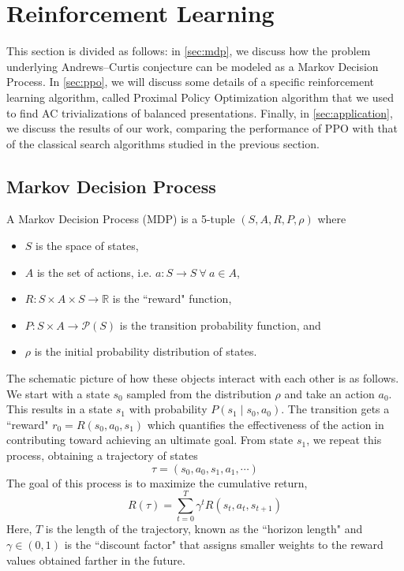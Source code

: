 
\section{Reinforcement Learning}\label{sec:rl}


This section is divided as follows: in \autoref{sec:mdp}, we discuss how the problem underlying Andrews--Curtis conjecture can be modeled as a Markov Decision Process. In \autoref{sec:ppo}, we will discuss some details of a specific reinforcement learning algorithm, called Proximal Policy Optimization algorithm that we used to find AC trivializations of balanced presentations. Finally, in \autoref{sec:application}, we discuss the results of our work, comparing the performance of PPO with that of the classical search algorithms studied in the previous section.

\subsection{Markov Decision Process} \label{sec:mdp}

A Markov Decision Process (MDP) is a 5-tuple $(S, A, R, P, \rho)$ where
\begin{itemize}
	\item $S$ is the space of states,
	\item $A$ is the set of actions, i.e. $a \colon S \to S \ \forall \ a \in A$,
	\item $R \colon S \times A \times S \to \mathbb{R}$ is the ``reward" function,
	\item $P \colon S \times A \to \mathcal{P}(S)$ is the transition probability function, and
	\item $\rho$ is the initial probability distribution of states.
\end{itemize}

The schematic picture of how these objects interact with each other is as follows. We start with a state $s_0$ sampled from the distribution $\rho$ and take an action $a_0$. This results in a state $s_1$ with probability $P(s_1 \mid s_0, a_0) $. The transition gets a ``reward" $r_0 = R(s_0, a_0, s_1)$ which quantifies the effectiveness of the action in contributing toward achieving an ultimate goal. From state $s_1$, we repeat this process, obtaining a trajectory of states
\[
\tau = \left( s_0, a_0, s_1, a_1, \cdots \right)
\]
The goal of this process is to maximize the cumulative return,
\[
R(\tau) = \sum\limits_{t=0}^{T} \gamma^t R(s_t, a_t, s_{t+1})
\]
Here, $T$ is the length of the trajectory, known as the ``horizon length" and $\gamma \in \left(0, 1 \right)$ is the ``discount factor" that assigns smaller weights to the reward values obtained farther in the future.
\newline

